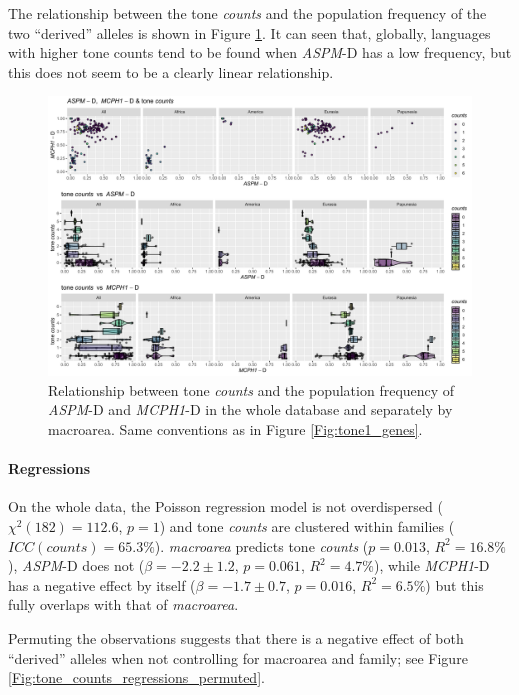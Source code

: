 \documentclass[twoside,onecolumn]{article}
\begin{document}
The relationship between the tone \textit{counts} and the population frequency of the two ``derived'' alleles is shown in Figure \ref{Fig:tone_counts_genes}.
It can seen that, globally, languages with higher tone counts tend to be found when \textit{ASPM}-D has a low frequency, but this does not seem to be a clearly linear relationship.

\begin{figure}[h]
  \centering
  \includegraphics[width=\textwidth]{../../code/figures/tone_counts_genes}
  \caption{Relationship between tone \textit{counts} and the population frequency of \textit{ASPM}-D and \textit{MCPH1}-D in the whole database and separately by macroarea. Same conventions as in Figure \ref{Fig:tone1_genes}.}
  \label{Fig:tone_counts_genes}
\end{figure}


\paragraph{Regressions}

On the whole data, the Poisson regression model is not overdispersed ($\chi^2(182) = 112.6$, $p = 1$) and tone \textit{counts} are clustered within families ($ICC(counts) = 65.3\%$).
\textit{macroarea} predicts tone \textit{counts} ($p = 0.013$, $R^2 = 16.8\%$), \textit{ASPM}-D does not ($\beta = -2.2 \pm 1.2$, $p = 0.061$, $R^2 = 4.7\%$), while \textit{MCPH1}-D has a negative effect by itself ($\beta = -1.7 \pm 0.7$, $p = 0.016$, $R^2 = 6.5\%$) but this fully overlaps with that of \textit{macroarea}.

Permuting the observations suggests that there is a negative effect of both ``derived'' alleles when not controlling for macroarea and family; see Figure \ref{Fig:tone_counts_regressions_permuted}.
\end{document}
